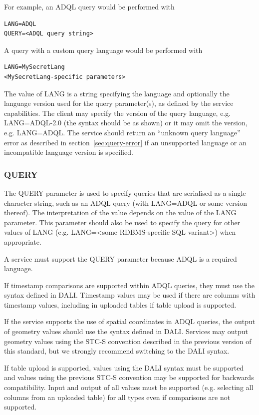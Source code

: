 \documentclass[11pt,letter]{ivoa}
\begin{document}
For example, an ADQL query would be performed with
\begin{verbatim}
LANG=ADQL
QUERY=<ADQL query string>
\end{verbatim}
A query with a custom query language would be performed with
\begin{verbatim}
LANG=MySecretLang
<MySecretLang-specific parameters>
\end{verbatim}
The value of LANG is a string specifying the language and optionally the 
language version used for the query parameter(s), as defined by the service 
capabilities.  The client may specify the version of the query language,  e.g. 
LANG=ADQL-2.0 (the syntax should be as shown) or it may omit the version, e.g. 
LANG=ADQL.  The service should return an “unknown query language” error as 
described in section~\ref{sec:query-error} if an unsupported language or an incompatible 
language version is specified.

\subsubsection{QUERY}
\label{sec:QUERY}

The QUERY parameter is used to specify queries that are serialised as a single character string, such as an ADQL query (with LANG=ADQL or some version thereof). The  interpretation
of the value depends on the value of the LANG parameter. This parameter should also be used to 
specify the query for other values of LANG (e.g. LANG=<some RDBMS-specific SQL 
variant>) when appropriate.

A service must support the QUERY parameter because ADQL is a required language.

If timestamp comparisons are supported within ADQL queries, they must use the syntax 
defined in DALI. Timestamp values may be used if there are columns with timestamp values, 
including in uploaded tables if table upload is supported.

If the service supports the use of spatial coordinates in ADQL queries, the output of 
geometry values should use the syntax defined in DALI. Services may output geometry values
using the STC-S convention described in the previous version of this standard, but we 
strongly recommend switching to the DALI syntax. 

If table upload is supported, values using the DALI syntax must be supported and values using 
the previous STC-S convention may be supported for backwards compatibility. Input and output of 
all values must be supported (e.g. selecting all columns from an uploaded table) for all types 
even if comparisons are not supported.
\end{document}
